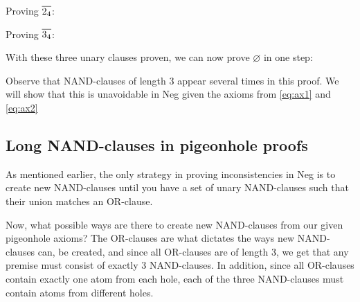 Proving $\ol{2_4}$:
\begin{prooftree*}[separation=0.8em, rule margin=1ex]
\end{prooftree*}

Proving $\ol{3_4}$:
\begin{prooftree*}[separation=0.8em, rule margin=1ex]
\end{prooftree*}

With these three unary clauses proven, we can now prove $\varnothing$ in one step:
\begin{prooftree*}[rule margin=1ex]
\end{prooftree*}

Observe that NAND-clauses of length 3 appear several times in this proof.
We will show that this is unavoidable in Neg given the axioms from \ref{eq:ax1} and \ref{eq:ax2}
\subsection{Long NAND-clauses in pigeonhole proofs}
\label{sub:Long NAND-clauses in pigeonhole proofs}
As mentioned earlier, the only strategy in proving inconsistencies in Neg is to create new NAND-clauses until you have a set of unary NAND-clauses such that their union matches an OR-clause.

Now, what possible ways are there to create new NAND-clauses from our given pigeonhole axioms?
The OR-clauses are what dictates the ways new NAND-clauses can, be created, and since all OR-clauses are of length 3, we get that any premise must consist of exactly 3 NAND-clauses.
In addition, since all OR-clauses contain exactly one atom from each hole, each of the three NAND-clauses must contain atoms from different holes.

